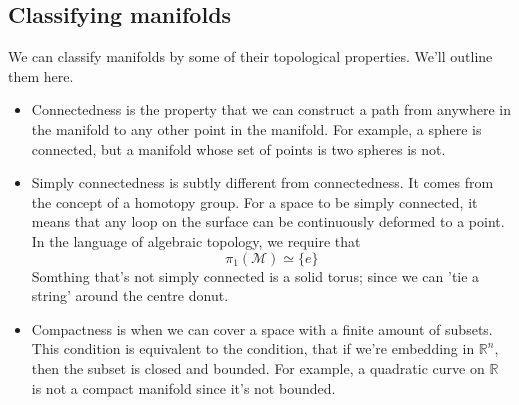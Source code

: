 \subsection{Classifying manifolds} 
We can classify manifolds by some of their topological properties. We'll outline them here. 

\begin{itemize} 
	\item Connectedness is the property that we can construct a path from anywhere in the manifold to any other point in the manifold. For example, a sphere is connected, but a manifold whose set of points is two spheres is not. 
	\item Simply connectedness is subtly different from connectedness. It comes from the concept of a homotopy group. For a space to be simply connected, it means that any loop on the surface can be continuously deformed to a point. In the language of algebraic topology, we require that 
\[ 	
	\pi_1 ( \mathcal{M} ) \simeq \{ e \} 
\] 
Somthing that's not simply connected is a solid torus; since we can 'tie a string' around the centre donut. 
 	\item Compactness is when we can cover a space with a finite amount of subsets. This condition is equivalent to the condition, that if we're embedding in $\mathbb{R}^n$, then the subset is closed and bounded. 
For example, a quadratic curve on $\mathbb{R}$ is not a compact manifold since it's not bounded. 
\end{itemize}
 

\pagebreak
